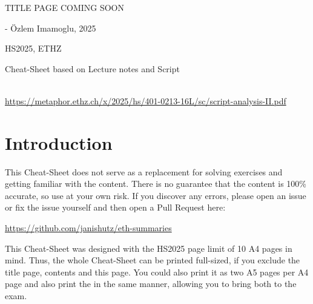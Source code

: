 \documentclass{article}
\begin{document}
\maketitle
\usetcolorboxes
{}


\vspace{2cm}
\begin{Huge}
    \begin{center}
        TITLE PAGE COMING SOON
    \end{center}
\end{Huge}


\vspace{4cm}
\begin{center}
    \begin{Large}
    \end{Large}

    \hspace{3cm} - Özlem Imamoglu, 2025
\end{center}

\vspace{3cm}
\begin{center}
    HS2025, ETHZ\\[0.2cm]
    \begin{Large}
        Cheat-Sheet based on Lecture notes and Script
    \end{Large}\\[0.2cm]

    \url{https://metaphor.ethz.ch/x/2025/hs/401-0213-16L/sc/script-analysis-II.pdf} 
\end{center}


\newpage
{}


\newpage
\section{Introduction}
This Cheat-Sheet does not serve as a replacement for solving exercises and getting familiar with the content.
There is no guarantee that the content is 100\% accurate, so use at your own risk. 
If you discover any errors, please open an issue or fix the issue yourself and then open a Pull Request here:

\url{https://github.com/janishutz/eth-summaries}

This Cheat-Sheet was designed with the HS2025 page limit of 10 A4 pages in mind. 
Thus, the whole Cheat-Sheet can be printed full-sized, if you exclude the title page, contents and this page.
You could also print it as two A5 pages per A4 page and also print the 
\color{MidnightBlue}\color{black} 
\smallhspace in the same manner, allowing you to bring both to the exam.
\end{document}
